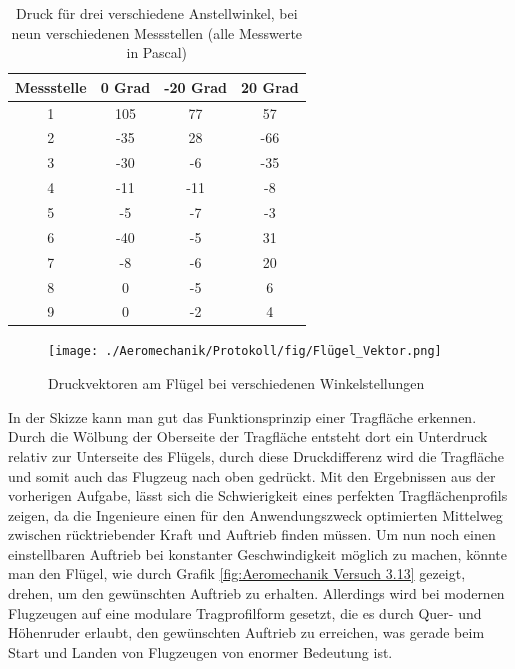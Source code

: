 \begin{table}
    \centering
    \caption{Druck für drei verschiedene Anstellwinkel, bei neun verschiedenen Messstellen (alle Messwerte in Pascal)}
    \begin{tabular}{c c c c}
    \hline
    Messstelle & 0 Grad & -20 Grad & 20 Grad \\
    \hline
    1 & 105 & 77 & 57 \\
    2 & -35 &  28 & -66 \\
    3 & -30 & -6 & -35 \\
    4 & -11 & -11 & -8 \\
    5 & -5 & -7 & -3 \\
    6 & -40 & -5 & 31 \\
    7 & -8 & -6 & 20 \\
    8 & 0 & -5 & 6 \\
    9 & 0 & -2 & 4 \\
    \hline
    \end{tabular}
    \label{tab:Aeromechanik Versuch 3.2}
\end{table}

\begin{figure}[h!]
    \centering
    \texttt{[image: ./Aeromechanik/Protokoll/fig/Flügel\_Vektor.png]}
    \caption{Druckvektoren am Flügel bei verschiedenen Winkelstellungen}
    \label{fig:Venturi}
\end{figure}

In der Skizze kann man gut das Funktionsprinzip einer Tragfläche erkennen. Durch die Wölbung der Oberseite der Tragfläche entsteht dort ein Unterdruck relativ zur Unterseite des Flügels, durch diese Druckdifferenz wird die Tragfläche und somit auch das Flugzeug nach oben gedrückt. Mit den Ergebnissen aus der vorherigen Aufgabe, lässt sich die Schwierigkeit eines perfekten Tragflächenprofils zeigen, da die Ingenieure einen für den Anwendungszweck optimierten Mittelweg zwischen rücktriebender Kraft und Auftrieb finden müssen. Um nun noch einen einstellbaren Auftrieb bei konstanter Geschwindigkeit möglich zu machen, könnte man den Flügel, wie durch Grafik \ref{fig:Aeromechanik Versuch 3.13} gezeigt, drehen, um den gewünschten Auftrieb zu erhalten. Allerdings wird bei modernen Flugzeugen auf eine modulare Tragprofilform gesetzt, die es durch Quer- und Höhenruder erlaubt, den gewünschten Auftrieb zu erreichen, was gerade beim Start und Landen von Flugzeugen von enormer Bedeutung ist.


